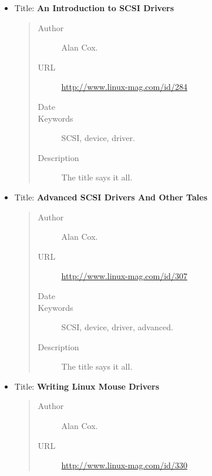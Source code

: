 \documentclass[a4paper,8pt,english]{sphinxmanual}
\begin{document}
\begin{itemize}
\begin{quote}
\begin{description}
\end{description}\end{quote}

\item {} 
Title: \textbf{An Introduction to SCSI Drivers}
\begin{quote}\begin{description}
\item[{Author}] \leavevmode
Alan Cox.

\item[{URL}] \leavevmode
\href{http://www.linux-mag.com/id/284}{http://www.linux-mag.com/id/284}

\item[{Date}] 

\item[{Keywords}] \leavevmode
SCSI, device, driver.

\item[{Description}] \leavevmode
The title says it all.

\end{description}\end{quote}

\item {} 
Title: \textbf{Advanced SCSI Drivers And Other Tales}
\begin{quote}\begin{description}
\item[{Author}] \leavevmode
Alan Cox.

\item[{URL}] \leavevmode
\href{http://www.linux-mag.com/id/307}{http://www.linux-mag.com/id/307}

\item[{Date}] 

\item[{Keywords}] \leavevmode
SCSI, device, driver, advanced.

\item[{Description}] \leavevmode
The title says it all.

\end{description}\end{quote}

\item {} 
Title: \textbf{Writing Linux Mouse Drivers}
\begin{quote}\begin{description}
\item[{Author}] \leavevmode
Alan Cox.

\item[{URL}] \leavevmode
\href{http://www.linux-mag.com/id/330}{http://www.linux-mag.com/id/330}


\end{description}
\end{quote}
\end{itemize}
\end{document}
